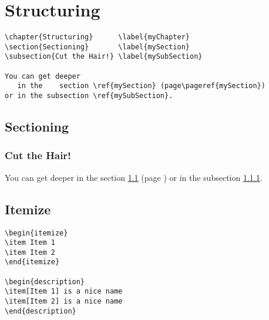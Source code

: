 \chapter{Structuring}\label{myChapter}

\begin{LaTeXsource}[Sectioning]
\begin{verbatim}
\chapter{Structuring}      \label{myChapter}
\section{Sectioning}       \label{mySection}
\subsection{Cut the Hair!} \label{mySubSection}

You can get deeper
   in the    section \ref{mySection} (page\pageref{mySection})
or in the subsection \ref{mySubSection}.
\end{verbatim}
\end{LaTeXsource}

\begin{Results}
\section{Sectioning}       \label{mySection}
\subsection{Cut the Hair!} \label{mySubSection}

You can get deeper
   in the    section \ref{mySection} (page \pageref{mySection})
or in the subsection \ref{mySubSection}.
\end{Results}

\pagebreak

\section{Itemize}

\begin{LaTeXsource}[Itemize]
\begin{verbatim}
\begin{itemize}
\item Item 1
\item Item 2
\end{itemize}

\begin{description}
\item[Item 1] is a nice name
\item[Item 2] is a nice name
\end{description}
\end{verbatim}
\end{LaTeXsource}

